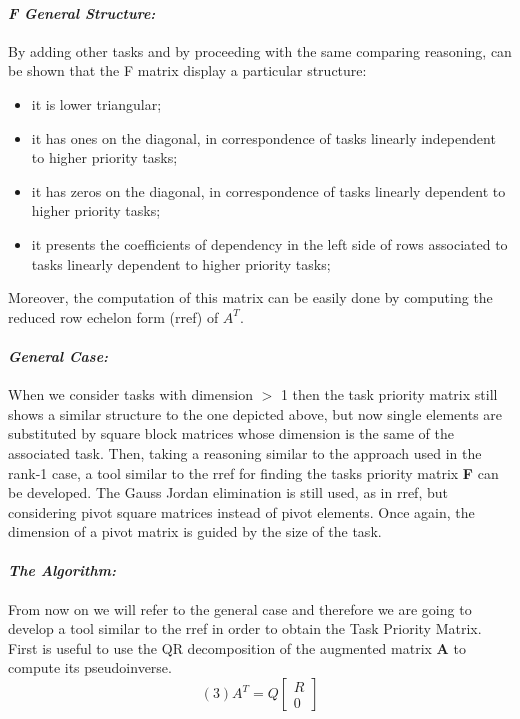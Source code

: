 \documentclass[12pt, a4paper]{article}
\begin{document}
\paragraph{\textit{F General Structure:}}

By adding other tasks and by proceeding with the same comparing reasoning, can be shown that the F matrix display a particular structure:
\begin{itemize}
\item it is lower triangular;
\item it has ones on the diagonal, in correspondence of tasks linearly independent to higher priority tasks;
\item it has zeros on the diagonal, in correspondence of tasks linearly dependent to higher priority tasks;
\item it presents the coefficients of dependency in the left side of rows associated to tasks linearly dependent to higher priority tasks;
\end{itemize}
Moreover, the computation of this matrix can be easily done by computing the reduced row echelon form (rref) of $A^T$.
\paragraph{\textit{General Case:}}

When we consider tasks with dimension $>$ 1 then the task priority matrix still shows a similar structure to the one depicted above, but now single elements are substituted by square block matrices whose dimension is the same of the associated task. Then, taking a reasoning similar to the approach used in the rank-1 case, a tool similar to the rref for finding the tasks priority matrix \textbf{F} can be developed. The Gauss Jordan elimination is still used, as in rref, but considering pivot square matrices instead of pivot elements. Once again, the dimension of a pivot matrix is guided by the size of
the task.

\paragraph{\textit{The Algorithm:}} 

From now on we will refer to the general case and therefore we are going to develop a tool similar to the rref in order to obtain the Task Priority Matrix.
First is useful to use the QR decomposition of the augmented matrix \textbf{A} to compute its pseudoinverse.
\[(3)
A^T = Q\begin{bmatrix}
R\\0
\end{bmatrix}
\]
\end{document}
